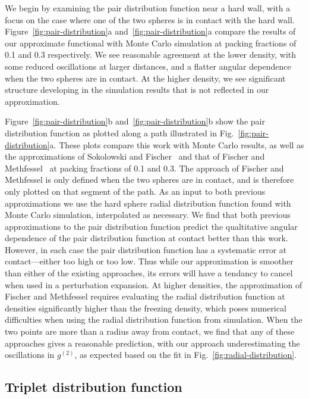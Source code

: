 \documentclass[letterpaper,twocolumn,amsmath,amssymb,pre,aps,10pt]{revtex4-1}
\begin{document}
We begin by examining the pair distribution function near a hard wall,
with a focus on the case where one of the two spheres is in contact
with the hard wall.  Figure~\ref{fig:pair-distribution}a
and~\ref{fig:pair-distribution}a compare the results of our
approximate functional with Monte Carlo simulation at packing
fractions of 0.1 and 0.3 respectively.  We see reasonable agreement at
the lower density, with some reduced oscillations at larger distances,
and a flatter angular dependence when the two spheres are in contact.
At the higher density, we see significant structure developing in the
simulation results that is not reflected in our approximation.

Figure~\ref{fig:pair-distribution}b
and~\ref{fig:pair-distribution}b show the pair distribution function
as plotted along a path illustrated in
Fig.~\ref{fig:pair-distribution}a.  These plots compare this work
with Monte Carlo results, as well as the approximations of Sokolowski
and Fischer~\cite{sokolowski1992role} and that of Fischer and
Methfessel~\cite{fischer1980born} at packing fractions of 0.1 and 0.3.
The approach of Fischer and Methfessel is only defined when the two
spheres are in contact, and is therefore only plotted on that segment
of the path.  As an input to both previous approximations we use the
hard sphere radial distribution function found with Monte Carlo
simulation, interpolated as necessary.  We find that both previous
approximations to the pair distribution function predict the
qualtitative angular dependence of the pair distribution function at
contact better than this work.  However, in each case the pair
distribution function has a systematic error at contact---either too
high or too low.  Thus while our approximation is smoother than either
of the existing approaches, its errors will have a tendancy to cancel
when used in a perturbation expansion.  At higher densities, the
approximation of Fischer and Methfessel requires evaluating the radial
distribution function at densities significantly higher than the
freezing density, which poses numerical difficulties when using the
radial distribution function from simulation.  When the two points are
more than a radius away from contact, we find that any of these
approaches gives a reasonable prediction, with our approach
underestimating the oscillations in $g^{(2)}$, as expected based on the
fit in Fig.~\ref{fig:radial-distribution}.

\subsection{Triplet distribution function}
\end{document}
